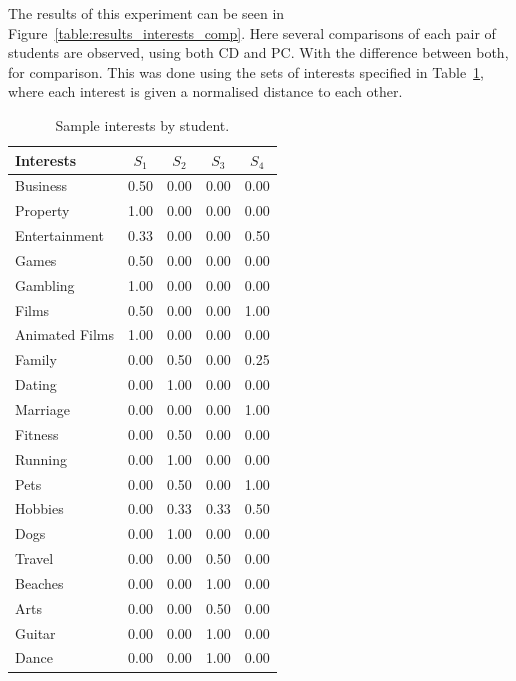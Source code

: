 The results of this experiment can be seen in Figure~\ref{table:results_interests_comp}. Here several comparisons of each pair of students are observed, using both CD and PC. With the difference between both, for comparison. This was done using the sets of interests specified in Table~\ref{table:sample_interests}, %
where each interest is given a normalised distance to each other.\\

\begin{table}[]
\centering
\begin{tabular}{lcccc}
\hline
Interests & $S_1$      & $S_2$      & $S_3$      & $S_4$      \\ \hline
Business       & 0.50 & 0.00 & 0.00 & 0.00       \\
Property       & 1.00 & 0.00 & 0.00 & 0.00       \\
Entertainment  & 0.33 & 0.00 & 0.00 & 0.50       \\
Games          & 0.50 & 0.00 & 0.00 & 0.00       \\
Gambling       & 1.00 & 0.00 & 0.00 & 0.00       \\
Films          & 0.50 & 0.00 & 0.00 & 1.00       \\
Animated Films & 1.00 & 0.00 & 0.00 & 0.00       \\
Family         & 0.00 & 0.50 & 0.00 & 0.25       \\
Dating         & 0.00 & 1.00 & 0.00 & 0.00       \\
Marriage       & 0.00 & 0.00 & 0.00 & 1.00       \\
Fitness        & 0.00 & 0.50 & 0.00 & 0.00       \\
Running        & 0.00 & 1.00 & 0.00 & 0.00       \\
Pets           & 0.00 & 0.50 & 0.00 & 1.00       \\
Hobbies        & 0.00 & 0.33 & 0.33 & 0.50       \\
Dogs           & 0.00 & 1.00 & 0.00 & 0.00       \\
Travel         & 0.00 & 0.00 & 0.50 & 0.00       \\
Beaches        & 0.00 & 0.00 & 1.00 & 0.00       \\
Arts           & 0.00 & 0.00 & 0.50 & 0.00       \\
Guitar         & 0.00 & 0.00 & 1.00 & 0.00       \\
Dance          & 0.00 & 0.00 & 1.00 & 0.00       \\ \hline
    \end{tabular}
    \caption{Sample interests by student.}
    \label{table:sample_interests}
\end{table}

